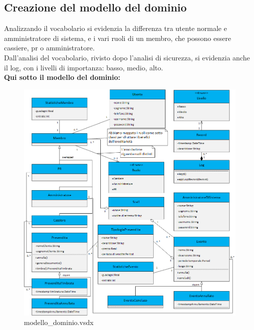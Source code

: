 \documentclass[a4paper]{article}
\begin{document}
\newpage

\subsection{Creazione del modello del dominio}

Analizzando il vocabolario si evidenzia la differenza tra utente normale e amministratore di sistema, e i vari ruoli di un membro, che possono essere cassiere, pr o amministratore.\\Dall'analisi del vocabolario, rivisto dopo l'analisi di sicurezza, si evidenzia anche il log, con i livelli di importanza: basso, medio, alto.\\\textbf{Qui sotto il modello del dominio:}\\



\begin{figure}[H]
    \includegraphics[scale=0.68]{Analisi/modello_dominio.png}
    \centering
    \caption{modello\_dominio.vsdx}
\end{figure}
\end{document}
